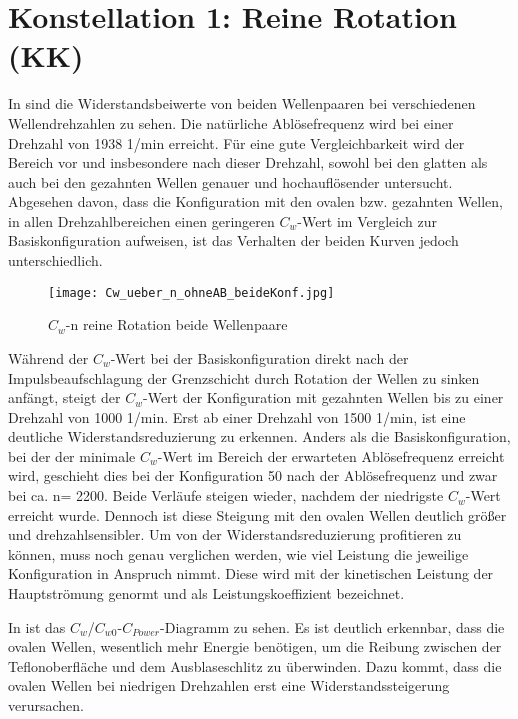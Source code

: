 \section{Konstellation 1: Reine Rotation (KK)}
\label{s:ReineRotation}

In   sind die Widerstandsbeiwerte von beiden Wellenpaaren bei verschiedenen Wellendrehzahlen zu sehen.
Die nat\"urliche Abl\"osefrequenz wird bei einer Drehzahl von 1938 1/min  erreicht. F\"ur eine gute Vergleichbarkeit wird der Bereich vor und insbesondere nach dieser Drehzahl, sowohl bei den glatten als auch bei den gezahnten Wellen genauer und hochaufl\"osender untersucht.
Abgesehen davon, dass die Konfiguration mit den ovalen bzw. gezahnten Wellen, in allen Drehzahlbereichen einen geringeren $C_{w}$-Wert im Vergleich zur Basiskonfiguration aufweisen, ist das Verhalten der beiden Kurven jedoch unterschiedlich.
\begin{figure}[h]
	\centering
	\texttt{[image: Cw\_ueber\_n\_ohneAB\_beideKonf.jpg]}
	\caption{ $C_{w}$-n reine Rotation beide Wellenpaare }
	\label{fig:Cw-n_Rein_Konf+2}
\end{figure}

W\"ahrend der $C_{w}$-Wert bei der Basiskonfiguration direkt nach der Impulsbeaufschlagung der Grenzschicht durch Rotation der Wellen zu sinken anf\"angt, steigt der $C_{w}$-Wert der Konfiguration mit gezahnten Wellen bis zu einer Drehzahl von 1000 1/min. Erst ab einer Drehzahl von 1500 1/min, ist eine deutliche Widerstandsreduzierung zu erkennen. 
Anders als die Basiskonfiguration, bei der der minimale $C_{w}$-Wert im Bereich der erwarteten Abl\"osefrequenz erreicht wird, geschieht dies bei der Konfiguration 50 nach der Abl\"osefrequenz und zwar bei ca. n= 2200. 
Beide Verl\"aufe steigen wieder, nachdem der niedrigste $C_{w}$-Wert erreicht wurde. Dennoch ist diese
Steigung mit den ovalen Wellen deutlich gr\"o\ss{}er und drehzahlsensibler.
Um von der Widerstandsreduzierung profitieren zu k\"onnen, muss noch genau verglichen werden, wie viel Leistung die jeweilige Konfiguration in Anspruch nimmt. Diese wird mit der kinetischen Leistung der Hauptstr\"omung genormt und als Leistungskoeffizient bezeichnet.

In  ist das $C_{w}$/$C_{w0}$-$C_{Power}$-Diagramm zu sehen. Es ist deutlich erkennbar, dass die ovalen Wellen, wesentlich mehr Energie ben\"otigen, um die Reibung zwischen der Teflonoberfl\"ache und dem Ausblaseschlitz zu \"uberwinden. Dazu kommt, dass die ovalen Wellen bei niedrigen Drehzahlen erst eine Widerstandssteigerung verursachen. 

